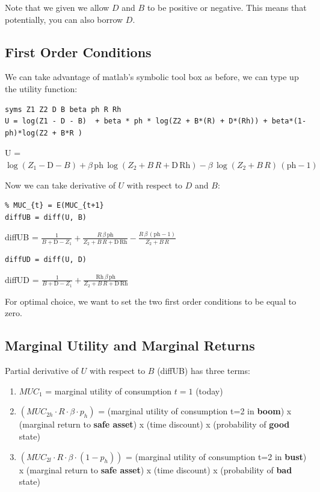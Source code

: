 \documentclass[
]{book}
\begin{document}
Note that we given we allow \(D\) and \(B\) to be positive or negative. This
means that potentially, you can also borrow \(D\).

\hypertarget{first-order-conditions}{%
\subsection{First Order Conditions}\label{first-order-conditions}}

We can take advantage of matlab's symbolic tool box as before, we can
type up the utility function:

\begin{verbatim}
syms Z1 Z2 D B beta ph R Rh
U = log(Z1 - D - B)  + beta * ph * log(Z2 + B*(R) + D*(Rh)) + beta*(1-ph)*log(Z2 + B*R )
\end{verbatim}

U =
\(\displaystyle \log \left(Z_1 -\textrm{D}-B\right)+\beta \,\textrm{ph}\,\log \left(Z_2 +B\,R+\textrm{D}\,\textrm{Rh}\right)-\beta \,\log \left(Z_2 +B\,R\right)\,{\left(\textrm{ph}-1\right)}\)

Now we can take derivative of \(U\) with respect to \(D\) and \(B\):

\begin{verbatim}
% MUC_{t} = E(MUC_{t+1}
diffUB = diff(U, B)
\end{verbatim}

diffUB =
\(\displaystyle \frac{1}{B+\textrm{D}-Z_1 }+\frac{R\,\beta \,\textrm{ph}}{Z_2 +B\,R+\textrm{D}\,\textrm{Rh}}-\frac{R\,\beta \,{\left(\textrm{ph}-1\right)}}{Z_2 +B\,R}\)

\begin{verbatim}
diffUD = diff(U, D)
\end{verbatim}

diffUD =
\(\displaystyle \frac{1}{B+\textrm{D}-Z_1 }+\frac{\textrm{Rh}\,\beta \,\textrm{ph}}{Z_2 +B\,R+\textrm{D}\,\textrm{Rh}}\)

For optimal choice, we want to set the two first order conditions to be
equal to zero.

\hypertarget{marginal-utility-and-marginal-returns}{%
\subsection{Marginal Utility and Marginal Returns}\label{marginal-utility-and-marginal-returns}}

Partial derivative of \(U\) with respect to \(B\) (diffUB) has three terms:

\begin{enumerate}
\def\labelenumi{\arabic{enumi}.}
\item
  \(MUC_1\) = marginal utility of consumption \(t=1\) (today)
\item
  \((MUC_{2h} \cdot R\cdot \beta \cdot p_h )\) = (marginal utility of
  consumption t=2 in \textbf{boom}) x (marginal return to \textbf{safe asset}) x
  (time discount) x (probability of \textbf{good} state)
\item
  \((MUC_{2l} \cdot R\cdot \beta \cdot (1-p_h ))\) = (marginal utility
  of consumption t=2 in \textbf{bust}) x (marginal return to \textbf{safe
  asset}) x (time discount) x (probability of \textbf{bad} state)
\end{enumerate}
\end{document}
